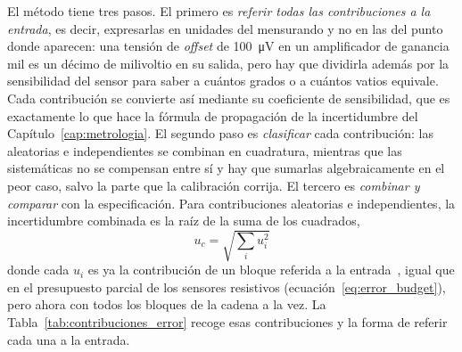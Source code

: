 El método tiene tres pasos. El primero es \emph{referir todas las contribuciones a la entrada}, es decir, expresarlas en unidades del mensurando y no en las del punto donde aparecen: una tensión de \emph{offset} de \SI{100}{\micro\volt} en un amplificador de ganancia mil es un décimo de milivoltio en su salida, pero hay que dividirla además por la sensibilidad del sensor para saber a cuántos grados o a cuántos vatios equivale. Cada contribución se convierte así mediante su coeficiente de sensibilidad, que es exactamente lo que hace la fórmula de propagación de la incertidumbre del Capítulo~\ref{cap:metrologia}. El segundo paso es \emph{clasificar} cada contribución: las aleatorias e independientes se combinan en cuadratura, mientras que las sistemáticas no se compensan entre sí y hay que sumarlas algebraicamente en el peor caso, salvo la parte que la calibración corrija. El tercero es \emph{combinar y comparar} con la especificación. Para contribuciones aleatorias e independientes, la incertidumbre combinada es la raíz de la suma de los cuadrados,
\begin{equation}\label{eq:presupuesto_global}
    u_c = \sqrt{\sum_{i} u_i^2}
\end{equation}
donde cada $u_i$ es ya la contribución de un bloque referida a la entrada~\cite{taylor1997erroranalysis}, igual que en el presupuesto parcial de los sensores resistivos (ecuación~\eqref{eq:error_budget}), pero ahora con todos los bloques de la cadena a la vez. La Tabla~\ref{tab:contribuciones_error} recoge esas contribuciones y la forma de referir cada una a la entrada.

